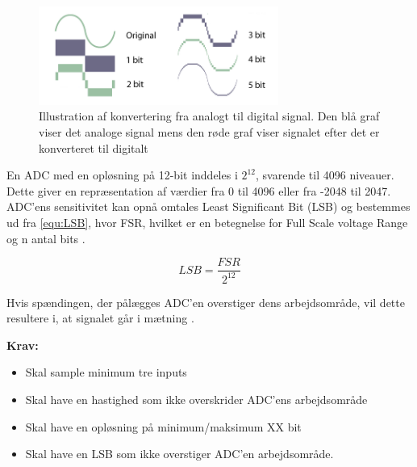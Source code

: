 \begin{figure}[H]
\centering
\includegraphics[width=0.7\textwidth]{figures/problemloesning/ADC_bit}
\caption{Illustration af konvertering fra analogt til digital signal. Den blå graf viser det analoge signal mens den røde graf viser signalet efter det er konverteret til digitalt}
\label{fig:ADC_bit}
\end{figure}

En ADC med en opløsning på 12-bit inddeles i ${2}^{12}$, svarende til 4096 niveauer. Dette giver en repræsentation af værdier fra 0 til 4096 eller fra -2048 til 2047. ADC'ens sensitivitet kan opnå omtales Least Significant Bit (LSB) og bestemmes ud fra \autoref{equ:LSB}, hvor FSR, hvilket er en betegnelse for Full Scale voltage Range og n antal bits \citep{webster1998, wolf2004}.

\begin{equation} \label{equ:LSB}
LSB=\dfrac{FSR}{2^{12}}
\end{equation}

\noindent
Hvis spændingen, der pålægges ADC'en overstiger dens arbejdsområde, vil dette resultere i, at signalet går i mætning \citep{webster1998, wolf2004}. 



\vspace{3mm}
\textbf{Krav:}
\begin{itemize}
\item Skal sample minimum tre inputs 
\item Skal have en hastighed som ikke overskrider ADC'ens arbejdsområde 
\item Skal have en opløsning på minimum/maksimum XX bit 
\item Skal have en LSB som ikke overstiger ADC'en arbejdsområde.
\end{itemize}

